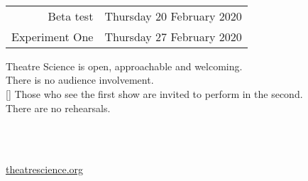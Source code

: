 \documentclass{article}
\begin{document}
  \thispagestyle{empty}

  \begin{center}

    \vspace*{2in}


    \vspace{1in}

    \\
    \vspace{0.5cm}
    \\
    \vspace{0.5cm}
    \\

    \vspace{1in}

    {\Huge


      \vspace{0.5in}

      \begin{tabular}{rl}

        Beta test       & Thursday 20 February 2020 \\
        Experiment One  & Thursday 27 February 2020 \\

      \end{tabular}


      \vspace{2.5in}

      Theatre Science is open, approachable and welcoming.  \\
      There is no audience involvement.\\
      [\baselineskip]
      Those who see the first show are invited to perform in the second.\\
      There are no rehearsals.

    }

    \vspace{1.5in}

    \\
    \vspace{0.2cm}
    \\

    \vspace{1in}

    {\Huge \url{theatrescience.org} \\ \ccby }

\end{center}
\end{document}
